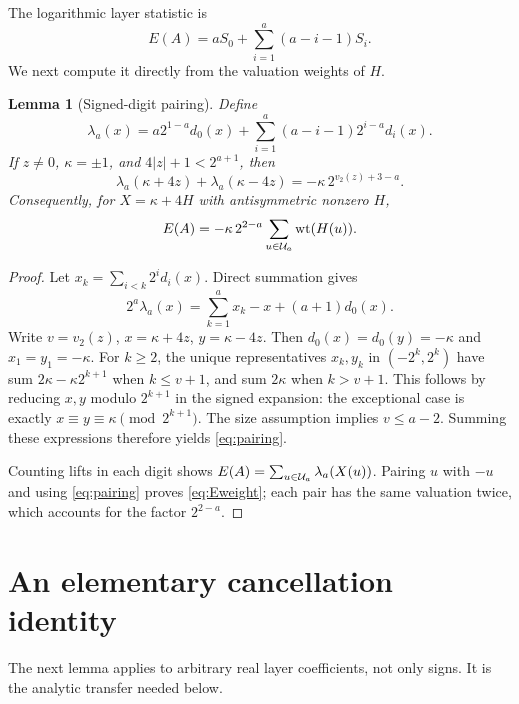 \documentclass[11pt,a4paper]{article}
\newtheorem{lemma}[theorem]{Lemma}
\theoremstyle{definition}\newtheorem{definition}[theorem]{Definition}
\theoremstyle{remark}\newtheorem{remark}[theorem]{Remark}
\begin{document}
The logarithmic layer statistic is
\begin{equation}\label{eq:E}
 E(A)=aS_0+\sum_{i=1}^a(a-i-1)S_i.
\end{equation}
We next compute it directly from the valuation weights of $H$.

\begin{lemma}[Signed-digit pairing]\label{lem:pairing}
Define
\[
 \lambda_a(x)=a2^{1-a}d_0(x)
       +\sum_{i=1}^a(a-i-1)2^{i-a}d_i(x).
\]
If $z\ne0$, $\kappa=\pm1$, and $4|z|+1<2^{a+1}$, then
\begin{equation}\label{eq:pairing}
 \lambda_a(\kappa+4z)+\lambda_a(\kappa-4z)
       =-\kappa\,2^{v_2(z)+3-a}.
\end{equation}
Consequently, for $X=\kappa+4H$ with antisymmetric nonzero $H$,
\begin{equation}\label{eq:Eweight}
 E(A)=-\kappa\,2^{2-a}\sum_{u\in\mathcal U_a}\operatorname{wt}(H(u)).
\end{equation}
\end{lemma}
\begin{proof}
Let $x_k=\sum_{i<k}2^i d_i(x)$. Direct summation gives
\[
 2^a\lambda_a(x)=\sum_{k=1}^a x_k-x+(a+1)d_0(x).
\]
Write $v=v_2(z)$, $x=\kappa+4z$, $y=\kappa-4z$.
Then $d_0(x)=d_0(y)=-\kappa$ and $x_1=y_1=-\kappa$.
For $k\ge2$, the unique representatives $x_k,y_k$ in
$(-2^k,2^k)$ have sum $2\kappa-\kappa2^{k+1}$ when $k\le v+1$,
and sum $2\kappa$ when $k>v+1$. This follows by reducing $x,y$
modulo $2^{k+1}$ in the signed expansion: the exceptional case is
exactly $x\equiv y\equiv\kappa\pmod{2^{k+1}}$.
The size assumption implies $v\le a-2$. Summing these expressions
therefore yields \eqref{eq:pairing}.

Counting lifts in each digit shows
$E(A)=\sum_{u\in\mathcal U_a}\lambda_a(X(u))$. Pairing $u$ with $-u$
and using \eqref{eq:pairing} proves \eqref{eq:Eweight}; each pair
has the same valuation twice, which accounts for the factor $2^{2-a}$.
\end{proof}

\section{An elementary cancellation identity}\label{sec:transfer}
The next lemma applies to arbitrary real layer coefficients, not only
signs. It is the analytic transfer needed below.
\end{document}
